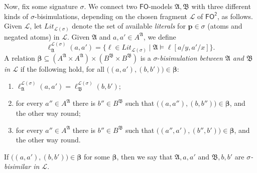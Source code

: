 \documentclass{lmcs} %
\theoremstyle{plain}\newtheorem{satz}[thm]{Satz} %
\newcommand{\FO}{\ensuremath{\mathsf{FO}}}
\newcommand{\FOT}{\ensuremath{\mathsf{FO^2}}}
\newcommand{\bs}{\boldsymbol{\beta}}
\newcommand{\fform}[1]{\boldsymbol{#1}}
\newcommand{\pvar}{\fform{p}}
\begin{document}
\begin{appendix}
Now, fix some signature $\sigma$.
We connect two \FO-models $\mathfrak A,\mathfrak B$ with three different kinds of $\sigma$-bisimulations,
depending on the chosen fragment $\mathcal L$ of \FOT{}, as follows.
Given $\mathcal{L}$, let $\textit{Lit}_{\mathcal{L}(\sigma)}$ denote the set of available \emph{literals} for $\pvar\in\sigma$ (atoms and negated atoms) in $\mathcal{L}$.
Given $\mathfrak A$ and $a,a'\in A^\mathfrak A$, we define 
%
\[
\ell_{\mathfrak A}^{\mathcal{L}(\sigma)}(a,a')=\bigl\{\ell\in \textit{Lit}_{\mathcal{L}(\sigma)} \mid \mathfrak A\models\ell[a/y,a'/x]\bigr\}.
\]
%
A relation $\bs\subseteq (A^\mathfrak A\times A^\mathfrak A)\times (B^\mathfrak B\times B^\mathfrak B) $
is a $\sigma$-\emph{bisimulation between $\mathfrak A$ and $\mathfrak B$ in $\mathcal{L}$} if the following hold,
for all $\bigl((a,a'),(b,b')\bigr)\in\bs$:
%
\begin{enumerate}
\item
$\ell_{\mathfrak A}^{\mathcal{L}(\sigma)}(a,a')=\ell_{\mathfrak B}^{\mathcal{L}(\sigma)}(b,b')$;
\item
for every $a''\in A^\mathfrak A$ there is $b''\in B^\mathfrak B$ such that $\bigl((a,a''),(b,b'')\bigr)\in\bs$, and the other way round;
\item
for every $a''\in A^\mathfrak A$ there is $b''\in B^\mathfrak B$ such that $\bigl((a'',a'),(b'',b')\bigr)\in\bs$, and the other way round.
\end{enumerate}
%
If $\bigl((a,a'),(b,b')\bigr)\in\bs$ for some $\bs$, then we say that $\mathfrak A,a,a'$ and $\mathfrak B,b,b'$ are \emph{$\sigma$-bisimilar in $\mathcal{L}$\/}.


\end{appendix}
\end{document}
